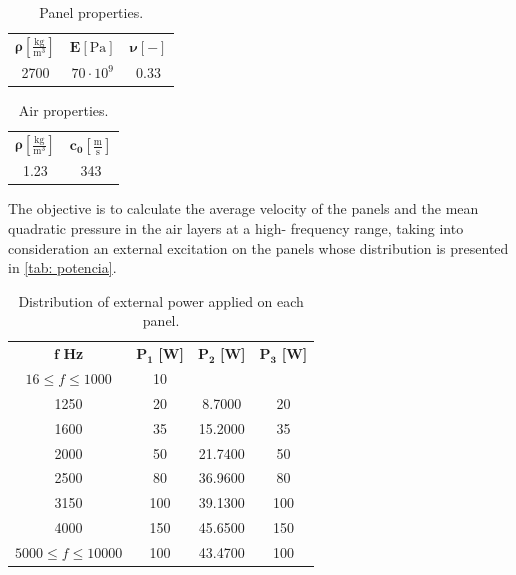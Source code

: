 \begin{table}[h]
    \caption{Panel properties.}
    \label{tab: panel}
    \centering
    \begin{tabular}{ccc}
    \toprule 
        $\boldsymbol{\rho} 		[\frac{\text{kg}}{\text{m}^3}]$  & $\boldsymbol{E} [\text{Pa}]$ &$\boldsymbol{\nu}[-]$ \\
        2700 & $70\cdot 10^{9}$ & 0.33 \\
       
        \bottomrule
    \end{tabular}
\end{table}

\begin{table}[h]
    \caption{Air properties.}
    \label{tab: air}
    \centering
    \begin{tabular}{cc}
    \toprule 
        $\boldsymbol{\rho} 		[\frac{\text{kg}}{\text{m}^3}]$  & $\boldsymbol{c_0} [\frac{\text{m}}{\text{s}}]$  \\
        1.23 & 343 \\
        \bottomrule
    \end{tabular}
\end{table}

The objective is to calculate the average velocity of the panels and the mean quadratic pressure in the air layers at a high- frequency range,  taking into consideration an external excitation on the panels whose distribution is presented in \autoref{tab: potencia}.

\begin{table}[h]
    \caption{Distribution of external power applied on each panel.}
    \label{tab: potencia}
    \centering
    \begin{tabular}{cccc}
    \toprule 
        $\boldsymbol{f} $ \textbf{Hz} &  $\boldsymbol{P_{1}}$ \textbf{[W]} &  $\boldsymbol{P_{2}}$ \textbf{[W]}&  $\boldsymbol{P_{3}}$ \textbf{[W]} \\
        $16 \leq f \leq 1000$ & 10 &  &  \\
        1250 & 20 & 8.7000 & 20\\
		1600 & 35 & 15.2000 & 35\\ 
		2000 & 50 & 21.7400 & 50\\ 
		2500 & 80 & 36.9600 & 80\\ 
		3150 & 100 & 39.1300 & 100\\ 
		4000 & 150 & 45.6500 & 150\\ 
		$5000 \leq f \leq 10000$ & 100 & 43.4700 & 100\\ 
        \bottomrule
    \end{tabular}
\end{table}

